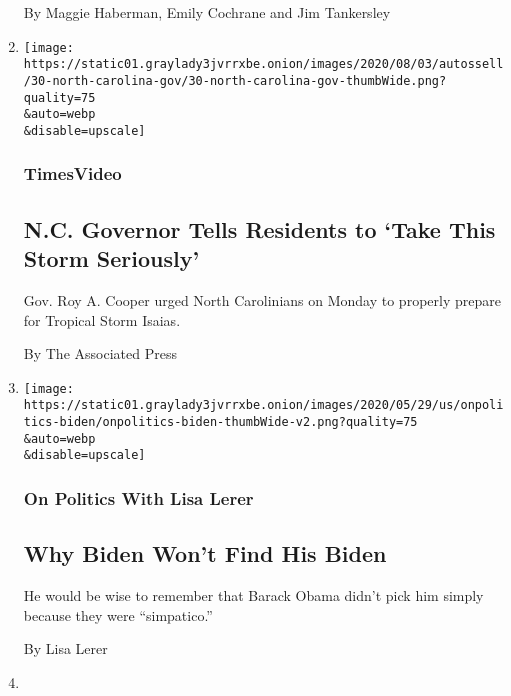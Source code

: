 \begin{enumerate}
  By Maggie Haberman, Emily Cochrane and Jim Tankersley
\item
  \href{/video/us/100000007271090/north-carolina-isaias-coronavirus.html}{}

  \texttt{[image: https://static01.graylady3jvrrxbe.onion/images/2020/08/03/autossell/30-north-carolina-gov/30-north-carolina-gov-thumbWide.png?quality=75\\\&auto=webp\\\&disable=upscale]}

  \hypertarget{timesvideo-1}{%
  \subsubsection{TimesVideo}\label{timesvideo-1}}

  \hypertarget{nc-governor-tells-residents-to-take-this-storm-seriously}{%
  \subsection{N.C. Governor Tells Residents to `Take This Storm
  Seriously'}\label{nc-governor-tells-residents-to-take-this-storm-seriously}}

  Gov. Roy A. Cooper urged North Carolinians on Monday to properly
  prepare for Tropical Storm Isaias.

  By The Associated Press
\item
  \href{/2020/08/03/us/politics/joe-biden-vp.html}{}

  \texttt{[image: https://static01.graylady3jvrrxbe.onion/images/2020/05/29/us/onpolitics-biden/onpolitics-biden-thumbWide-v2.png?quality=75\\\&auto=webp\\\&disable=upscale]}

  \hypertarget{on-politics-with-lisa-lerer}{%
  \subsubsection{On Politics With Lisa
  Lerer}\label{on-politics-with-lisa-lerer}}

  \hypertarget{why-biden-wont-find-his-biden}{%
  \subsection{Why Biden Won't Find His
  Biden}\label{why-biden-wont-find-his-biden}}

  He would be wise to remember that Barack Obama didn't pick him simply
  because they were ``simpatico.''

  By Lisa Lerer
\item
  \href{/2020/08/03/us/coronavirus-today.html}{}


\end{enumerate}
